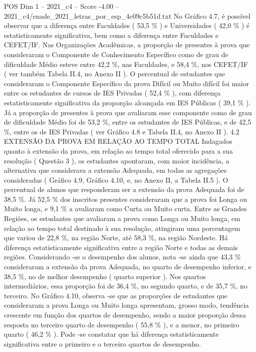 \begin{textsample}{POS Dim 1 – 2021\_c4 – Score -4.00 – 2021\_c4/enade\_2021\_letras\_por\_esp\_4c09c5b51d.txt}
No Gráfico 4.7, é possível observar que a diferença entre Faculdades ( 53,5 \% ) e Universidades ( 42,0 \% ) é estatisticamente significativa, bem como a diferença entre Faculdades e CEFET/IF.
Nas Organizações Acadêmicas, a proporção de presentes à prova que consideraram o Componente de Conhecimento Específico como de grau de dificuldade Médio esteve entre 42,2 \%, nas Faculdades, e 58,4 \%, nos CEFET/IF ( ver também Tabela II.4, no Anexo II ).
O percentual de estudantes que consideraram o Componente Específico da prova Difícil ou Muito difícil foi maior entre os estudantes de cursos de IES Privadas ( 52,4 \% ), com diferença estatisticamente significativa da proporção alcançada em IES Públicas ( 39,1 \% ).
Já a proporção de presentes à prova que avaliaram esse componente como de grau de dificuldade Médio foi de 53,2 \%, entre os estudantes de IES Públicas, e de 42,5 \%, entre os de IES Privadas ( ver Gráfico 4.8 e Tabela II.4, no Anexo II ). 4.2 EXTENSÃO DA PROVA EM RELAÇÃO AO TEMPO TOTAL Indagados quanto à extensão da prova, em relação ao tempo total oferecido para a sua resolução ( Questão 3 ), os estudantes apontaram, com maior incidência, a alternativa que considerava a extensão Adequada, em todas as agregações consideradas ( Gráfico 4.9, Gráfico 4.10, e, no Anexo II, a Tabela II.5 ).
O percentual de alunos que responderam ser a extensão da prova Adequada foi de 38,5 \%.
Já 52,5 \% dos inscritos presentes consideraram que a prova foi Longa ou Muito longa, e 9,1 \% a avaliaram como Curta ou Muito curta.
Entre as Grandes Regiões, os estudantes que avaliaram a prova como Longa ou Muito longa, em relação ao tempo total destinado à sua resolução, atingiram uma porcentagem que variou de 22,8 \%, na região Norte, até 58,3 \%, na região Nordeste.
Há diferença estatisticamente significativa entre a região Norte e todas as demais regiões.
Considerando -se o desempenho dos alunos, nota -se ainda que 43,3 \% consideraram a extensão da prova Adequada, no quarto de desempenho inferior, e 38,5 \%, no de melhor desempenho ( quarto superior ).
Nos quartos intermediários, essa proporção foi de 36,4 \%, no segundo quarto, e de 35,7 \%, no terceiro.
No Gráfico 4.10, observa -se que as proporções de estudantes que consideraram a prova Longa ou Muito longa apresentam, grosso modo, tendência crescente em função dos quartos de desempenho, sendo a maior proporção dessa resposta no terceiro quarto de desempenho ( 55,8 \% ), e a menor, no primeiro quarto ( 46,2 \% ).
Pode -se constatar que há diferença estatisticamente significativa entre o primeiro e o terceiro quartos de desempenho.

\end{textsample}
